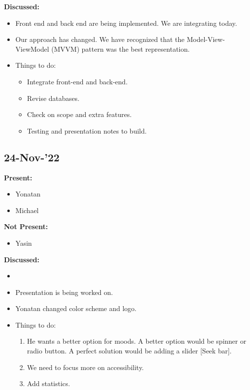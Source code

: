 \documentclass[11pt]{article}
\begin{document}
    \textbf{Discussed:}
    \begin{itemize}
        \item  Front end and back end are being implemented.
        We are integrating today.
        \item  Our approach has changed.
        We have recognized that the Model-View-ViewModel (MVVM) pattern was the best representation.
        \item Things to do:
        \begin{itemize}
            \item Integrate front-end and back-end.
            \item Revise databases.
            \item Check on scope and extra features.
            \item Testing and presentation notes to build.
        \end{itemize}
    \end{itemize}

    \subsection{24-Nov-’22}\label{subsec:24-nov-22}
    \textbf{Present:}
    \begin{itemize}
        \item Yonatan
        \item Michael
    \end{itemize}

    \textbf{Not Present:}

    \begin{itemize}
        \item Yasin
    \end{itemize}

    \textbf{Discussed:}

    \begin{itemize}
        \item
        \item Presentation is being worked on.
        \item Yonatan changed color scheme and logo.
        \item Things to do:
        \begin{enumerate}
            \item  He wants a better option for moods.
            A better option would be spinner or radio button.
            A perfect solution would be adding a slider [Seek bar].
            \item  We need to focus more on accessibility.
            \item  Add statistics.
        \end{enumerate}
    \end{itemize}
\end{document}
